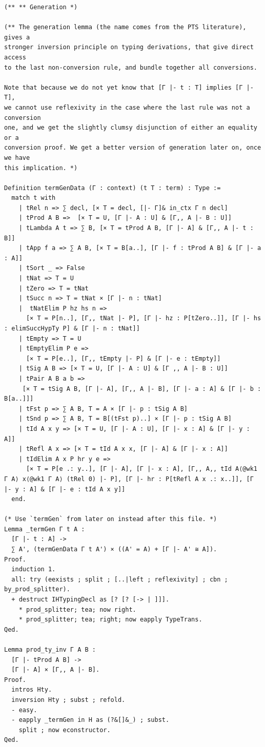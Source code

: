 \documentclass[10pt,a4paper]{amsart}
\begin{document}
\begin{lstlisting}
(** ** Generation *)

(** The generation lemma (the name comes from the PTS literature), gives a 
stronger inversion principle on typing derivations, that give direct access
to the last non-conversion rule, and bundle together all conversions.

Note that because we do not yet know that [Γ |- t : T] implies [Γ |- T],
we cannot use reflexivity in the case where the last rule was not a conversion
one, and we get the slightly clumsy disjunction of either an equality or a
conversion proof. We get a better version of generation later on, once we have
this implication. *)

Definition termGenData (Γ : context) (t T : term) : Type :=
  match t with
    | tRel n => ∑ decl, [× T = decl, [|- Γ]& in_ctx Γ n decl]
    | tProd A B =>  [× T = U, [Γ |- A : U] & [Γ,, A |- B : U]]
    | tLambda A t => ∑ B, [× T = tProd A B, [Γ |- A] & [Γ,, A |- t : B]]
    | tApp f a => ∑ A B, [× T = B[a..], [Γ |- f : tProd A B] & [Γ |- a : A]]
    | tSort _ => False
    | tNat => T = U
    | tZero => T = tNat
    | tSucc n => T = tNat × [Γ |- n : tNat]
    |  tNatElim P hz hs n =>
      [× T = P[n..], [Γ,, tNat |- P], [Γ |- hz : P[tZero..]], [Γ |- hs : elimSuccHypTy P] & [Γ |- n : tNat]]
    | tEmpty => T = U
    | tEmptyElim P e =>
      [× T = P[e..], [Γ,, tEmpty |- P] & [Γ |- e : tEmpty]]
    | tSig A B => [× T = U, [Γ |- A : U] & [Γ ,, A |- B : U]]
    | tPair A B a b =>
     [× T = tSig A B, [Γ |- A], [Γ,, A |- B], [Γ |- a : A] & [Γ |- b : B[a..]]]
    | tFst p => ∑ A B, T = A × [Γ |- p : tSig A B]
    | tSnd p => ∑ A B, T = B[(tFst p)..] × [Γ |- p : tSig A B]
    | tId A x y => [× T = U, [Γ |- A : U], [Γ |- x : A] & [Γ |- y : A]]
    | tRefl A x => [× T = tId A x x, [Γ |- A] & [Γ |- x : A]]
    | tIdElim A x P hr y e => 
      [× T = P[e .: y..], [Γ |- A], [Γ |- x : A], [Γ,, A,, tId A⟨@wk1 Γ A⟩ x⟨@wk1 Γ A⟩ (tRel 0) |- P], [Γ |- hr : P[tRefl A x .: x..]], [Γ |- y : A] & [Γ |- e : tId A x y]]
  end.

(* Use `termGen` from later on instead after this file. *)
Lemma _termGen Γ t A :
  [Γ |- t : A] ->
  ∑ A', (termGenData Γ t A') × ((A' = A) + [Γ |- A' ≅ A]).
Proof.
  induction 1.
  all: try (eexists ; split ; [..|left ; reflexivity] ; cbn ; by_prod_splitter).
  + destruct IHTypingDecl as [? [? [-> | ]]].
    * prod_splitter; tea; now right.
    * prod_splitter; tea; right; now eapply TypeTrans.
Qed.

Lemma prod_ty_inv Γ A B :
  [Γ |- tProd A B] ->
  [Γ |- A] × [Γ,, A |- B].
Proof.
  intros Hty.
  inversion Hty ; subst ; refold.
  - easy.
  - eapply _termGen in H as (?&[]&_) ; subst.
    split ; now econstructor.
Qed.


\end{lstlisting}
\end{document}

